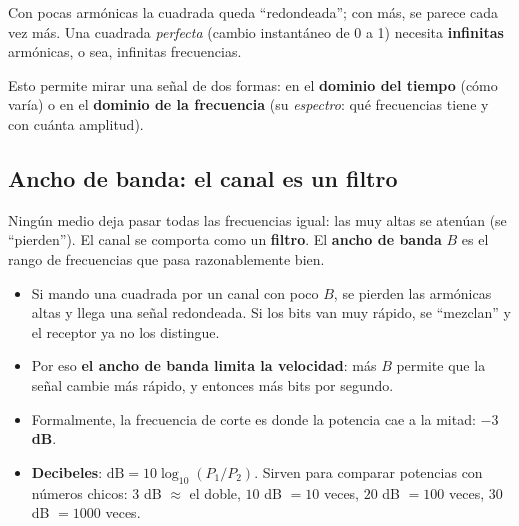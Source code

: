 \documentclass[10pt,a4paper]{article}
\newcommand{\term}[1]{\textbf{\color{azul}#1}}
\begin{document}
Con pocas armónicas la cuadrada queda ``redondeada''; con más, se parece cada vez más.
Una cuadrada \emph{perfecta} (cambio instantáneo de 0 a 1) necesita \textbf{infinitas} armónicas, o sea, infinitas frecuencias.

Esto permite mirar una señal de dos formas: en el \term{dominio del tiempo} (cómo varía) o en el
\term{dominio de la frecuencia} (su \emph{espectro}: qué frecuencias tiene y con cuánta amplitud).

\subsection{Ancho de banda: el canal es un filtro}
\begin{idea}
Ningún medio deja pasar todas las frecuencias igual: las muy altas se atenúan (se ``pierden'').
El canal se comporta como un \textbf{filtro}. El \term{ancho de banda} $B$ es el rango de
frecuencias que pasa razonablemente bien.
\end{idea}
\begin{itemize}
  \item Si mando una cuadrada por un canal con poco $B$, se pierden las armónicas altas y llega una señal redondeada.
        Si los bits van muy rápido, se ``mezclan'' y el receptor ya no los distingue.
  \item Por eso \textbf{el ancho de banda limita la velocidad}: más $B$ permite que la señal cambie más rápido, y entonces más bits por segundo.
  \item Formalmente, la frecuencia de corte es donde la potencia cae a la mitad: \textbf{$-3$ dB}.
  \item \term{Decibeles}: $\text{dB} = 10\log_{10}(P_1/P_2)$. Sirven para comparar potencias con números chicos:
        $3$ dB $\approx$ el doble, $10$ dB $= 10$ veces, $20$ dB $= 100$ veces, $30$ dB $= 1000$ veces.
\end{itemize}
\end{document}
